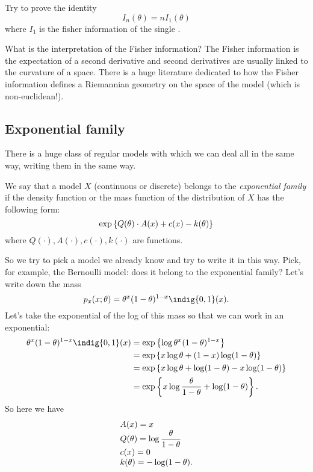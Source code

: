 \documentclass[12pt]{report}
\begin{document}
\begin{remark}
	Try to prove the identity
	\begin{equation*}
		I_{n}(\theta)=nI_{1}(\theta)
	\end{equation*}
	where $I_{1}$ is the fisher information of the single \rv.
\end{remark}
What is the interpretation of the Fisher information? The Fisher information is the expectation of a second derivative and second derivatives are usually linked to the curvature of a space. There is a huge literature dedicated to how the Fisher information defines a Riemannian geometry on the space of the model (which is non-euclidean!).\par
\subsection{Exponential family}
There is a huge class of regular models with which we can deal all in the same way, writing them in the same way. 
\begin{definition}
	We say that a model $X$ (continuous or discrete) belongs to the \emph{exponential family} if the density function or the mass function of the distribution of $X$ has the following form:
	\begin{equation*}
		\exp\left\{Q(\theta)\cdot A(x)+c(x)-k(\theta)\right\}
	\end{equation*}
	where $Q(\cdot),A(\cdot),c(\cdot),k(\cdot)$ are functions.
\end{definition}
So we try to pick a model we already know and try to write it in this way. Pick, for example, the Bernoulli model: does it belong to the exponential family? Let's write down the mass
\begin{equation*}
	p_{x}(x;\theta)=\theta^{x}(1-\theta)^{1-x}\indig{0,1}(x).
\end{equation*}
Let's take the exponential of the log of this mass so that we can work in an exponential:
\begin{align*}
	\theta^{x}(1-\theta)^{1-x}\indig{0,1}(x)&=\expg{\log\theta^{x}(1-\theta)^{1-x}}\\
	&=\expg{x\log \theta+(1-x)\log(1-\theta)}\\
	&=\expg{x\log\theta+\log(1-\theta)-x\log(1-\theta)}\\
	&=\expg{x\log\frac{\theta}{1-\theta}+\log(1-\theta)}.
\end{align*}
So here we have
\begin{equation*}
	\begin{array}{>{\displaystyle}l}
		A(x)=x\\
		Q(\theta)=\log\frac{\theta}{1-\theta}\\
		c(x)=0\\
		k(\theta)=-\log(1-\theta).
	\end{array}
\end{equation*}
\end{document}
